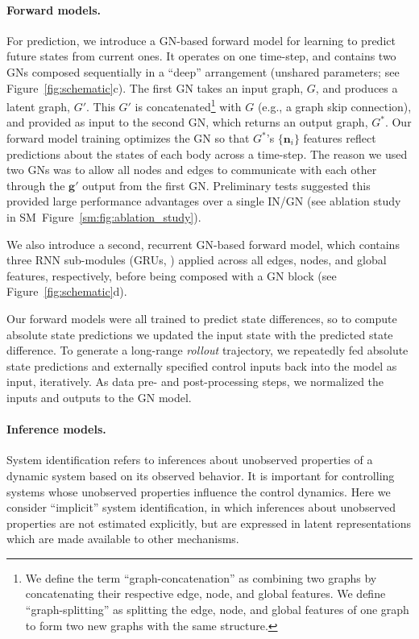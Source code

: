 \documentclass{article}
\begin{document}





\paragraph{Forward models.}
For prediction, we introduce a GN-based forward model for learning to predict future states from current ones. 
%
It operates on one time-step, and contains two GNs composed sequentially in a ``deep'' arrangement (unshared parameters; see Figure~\ref{fig:schematic}c). The first GN takes an input graph, $G$, and produces a latent graph, $G'$. This $G'$ is concatenated\footnote{We define the term ``graph-concatenation'' as combining two graphs by concatenating their respective edge, node, and global features. We define ``graph-splitting'' as splitting the edge, node, and global features of one graph to form two new graphs with the same structure.\label{fn:graph-cat-split}} with $G$ (e.g., a graph skip connection), and provided as input to the second GN, which returns an output graph, $G^*$. Our forward model training optimizes the GN so that $G^*$'s $\{\mathbf{n}_i\}$ features reflect predictions about the states of each body across a time-step. The reason we used two GNs was to allow all nodes and edges to communicate with each other through the $\mathbf{g}'$ output from the first GN. Preliminary tests suggested this provided large performance advantages over a single IN/GN (see ablation study in SM~Figure~\ref{sm:fig:ablation_study}).

We also introduce a second, recurrent GN-based forward model, which contains three RNN sub-modules (GRUs, \cite{cho2014properties}) applied across all edges, nodes, and global features, respectively, before being composed with a GN block (see Figure~\ref{fig:schematic}d). 

Our forward models were all trained to predict state differences, so to compute absolute state predictions we updated the input state with the predicted state difference. To generate a long-range \emph{rollout} trajectory, we repeatedly fed absolute state predictions and externally specified control inputs back into the model as input, iteratively. As data pre- and post-processing steps, we normalized the inputs and outputs to the GN model.

\paragraph{Inference models.}
System identification refers to inferences about unobserved properties of a dynamic system based on its observed behavior. It is important for controlling systems whose unobserved properties influence the control dynamics. Here we consider ``implicit'' system identification, in which inferences about unobserved properties are not estimated explicitly, but are expressed in latent representations which are made available to other mechanisms.
\end{document}
